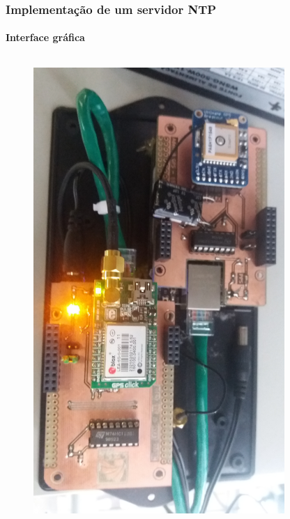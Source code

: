 \begin{frame}
\frametitle{Implementação de um servidor NTP}
\framesubtitle{Interface gráfica} 
\begin{columns}
\begin{column}{.5\textwidth}
\begin{figure}[h]
    \centering
    \includegraphics[width=0.85\textwidth]{image/gps} \\

\end{figure}
\end{column}
\end{columns}
\end{frame}
